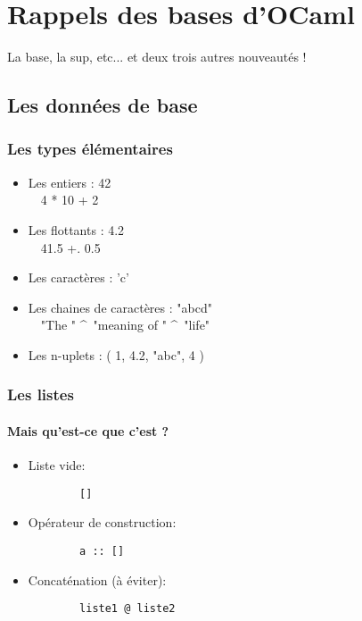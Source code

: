 \section{Rappels des bases d'OCaml}
\begin{frame}
  \begin{center}
	\huge
	La base, la sup, etc... et deux trois autres nouveautés !
  \end{center}
\end{frame}

\subsection{Les données de base} %
\begin{frame}[fragile]
	\frametitle{Les types élémentaires}
	\begin{itemize}
		\item Les entiers : 42\\
			~~4 * 10 + 2
		\item Les flottants : 4.2\\
			~~41.5 +. 0.5
		\item Les caractères : 'c'\\
		\item Les chaines de caractères : "abcd"\\
			~~"The " \^~"meaning of " \^~"life"
			\item Les n-uplets : ( 1, 4.2, "abc", 4 )
	\end{itemize}
\end{frame}

\begin{frame}[fragile]
	\frametitle{Les listes}
	\framesubtitle{Mais qu'est-ce que c'est ?}
	\begin{itemize}

	\item Liste vide:
		\begin{lstlisting}
		[]
		\end{lstlisting}

	\item Opérateur de construction:
		\begin{lstlisting}
		a :: []
		\end{lstlisting}

	\item Concaténation (à éviter):
		\begin{lstlisting}
		liste1 @ liste2
		\end{lstlisting}

	\end{itemize}
\end{frame}

